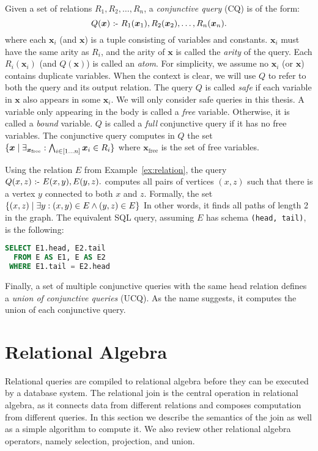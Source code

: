 Given a set of relations $R_1, R_2, \ldots, R_n$, 
 a {\em conjunctive query} (CQ) is of the form:
\[
  Q(\bm{x}) \text{ :- } R_1(\bm{x}_1), R_2(\bm{x}_2), \ldots, R_n(\bm{x}_n).
\]
where each $\bm{x}_i$ (and $\bm{x}$) is a tuple consisting of variables and constants.
$\bm{x}_i$ must have the same arity as $R_i$,
 and the arity of $\bm{x}$ is called the {\em arity} of the query.
Each $R_i({\bm x_i})$ (and $Q({\bm x})$) is called an {\em atom}.
For simplicity, we assume no $\bm{x}_i$ (or $\bm{x}$) contains duplicate variables.
When the context is clear, 
 we will use $Q$ to refer to both the query and its output relation.
The query $Q$ is called {\em safe} if each variable in $\bm{x}$ also appears in some $\bm{x}_i$.
We will only consider safe queries in this thesis.
A variable only appearing in the body is called a {\em free} variable.
Otherwise, it is called a {\em bound} variable. 
$Q$ is called a {\em full} conjunctive query if it has no free variables.
The conjunctive query computes in $Q$ the set 
 $\{{\bm x}\mid{\exists_{\bm x_\text{free}} : \bigwedge_{i \in [1 \ldots n]} {\bm x_i} \in R_i}\}$
 where ${\bm x_\text{free}}$ is the set of free variables.

\begin{ex}
\label{ex:cq}
Using the relation $E$ from Example~\ref{ex:relation},
 the query $Q(x, z) \text{ :- } E(x, y), E(y, z).$
 computes all pairs of vertices $(x, z)$ 
 such that there is a vertex $y$ 
 connected to both $x$ and $z$.
Formally, the set $\{{(x, z)}\mid{\exists y : (x, y) \in E \wedge (y, z) \in E}\}$
In other words, it finds all paths of length 2 in the graph.
The equivalent SQL query, assuming $E$ has schema \texttt{(head, tail)}, is the following:
\begin{lstlisting}[language=SQL]
SELECT E1.head, E2.tail
  FROM E AS E1, E AS E2
 WHERE E1.tail = E2.head
\end{lstlisting}
\end{ex}

Finally, a set of multiple conjunctive queries with the same head relation
 defines a {\em union of conjunctive queries} (UCQ).
As the name suggests, it computes the union of each conjunctive query.

\section{Relational Algebra}
\label{sec:join}

Relational queries are compiled to relational algebra 
 before they can be executed by a database system.
The relational join is the central operation in relational algebra,
 as it connects data from different relations 
 and composes computation from different queries.
In this section we describe the semantics of the join
 as well as a simple algorithm to compute it.
We also review other relational algebra operators,
 namely selection, projection, and union.

